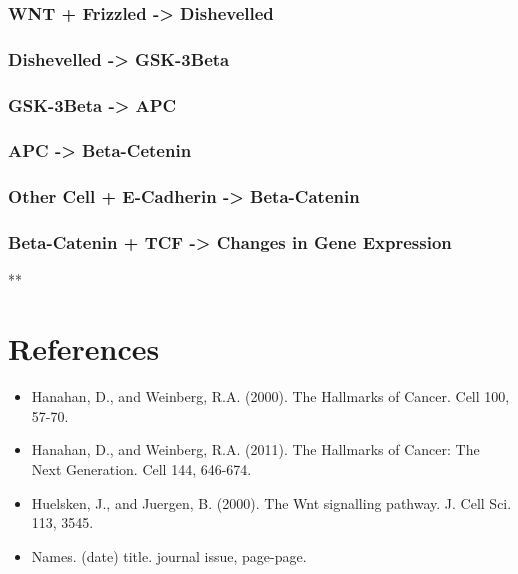 \documentclass[11pt]{article}
\begin{document}
\subsubsection{WNT + Frizzled -> Dishevelled}
\label{sec-2-1-1}
\subsubsection{Dishevelled -> GSK-3Beta}
\label{sec-2-1-2}
\subsubsection{GSK-3Beta -> APC}
\label{sec-2-1-3}
\subsubsection{APC -> Beta-Cetenin}
\label{sec-2-1-4}
\subsubsection{Other Cell + E-Cadherin -> Beta-Catenin}
\label{sec-2-1-5}
\subsubsection{Beta-Catenin + TCF -> Changes in Gene Expression}
\label{sec-2-1-6}
**

\section{References}
\label{sec-3}
\begin{itemize}
\item Hanahan, D., and Weinberg, R.A. (2000). The Hallmarks of Cancer. Cell 100, 57-70.
\item Hanahan, D., and Weinberg, R.A. (2011). The Hallmarks of Cancer: The Next Generation. Cell 144, 646-674.
\item Huelsken, J., and Juergen, B. (2000). The Wnt signalling pathway. J. Cell Sci. 113, 3545.
\end{itemize}



\begin{itemize}
\item Names. (date) title. journal issue, page-page.
\end{itemize}
\end{document}
